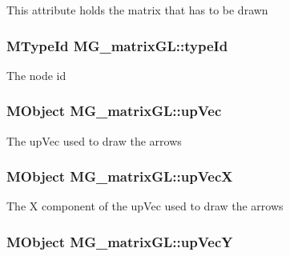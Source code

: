 This attribute holds the matrix that has to be drawn \hypertarget{class_m_g__matrix_g_l_a75dbb68a56bba1adac39fb0ba441b9db}{
\subsubsection[{type\-Id}]{\setlength{\rightskip}{0pt plus 5cm}M\-Type\-Id M\-G\-\_\-matrix\-G\-L\-::type\-Id\hspace{0.3cm}{\ttfamily [static]}}}\label{class_m_g__matrix_g_l_a75dbb68a56bba1adac39fb0ba441b9db}
The node id \hypertarget{class_m_g__matrix_g_l_a484c3621def1530581ceaf161accedc4}{
\subsubsection[{up\-Vec}]{\setlength{\rightskip}{0pt plus 5cm}M\-Object M\-G\-\_\-matrix\-G\-L\-::up\-Vec\hspace{0.3cm}{\ttfamily [static]}}}\label{class_m_g__matrix_g_l_a484c3621def1530581ceaf161accedc4}
The up\-Vec used to draw the arrows \hypertarget{class_m_g__matrix_g_l_a87088f365313b8f54aff381bb775a362}{
\subsubsection[{up\-Vec\-X}]{\setlength{\rightskip}{0pt plus 5cm}M\-Object M\-G\-\_\-matrix\-G\-L\-::up\-Vec\-X\hspace{0.3cm}{\ttfamily [static]}}}\label{class_m_g__matrix_g_l_a87088f365313b8f54aff381bb775a362}
The X component of the up\-Vec used to draw the arrows \hypertarget{class_m_g__matrix_g_l_a744964298d0a1ea37d1f1ea6942d9f41}{
\subsubsection[{up\-Vec\-Y}]{\setlength{\rightskip}{0pt plus 5cm}M\-Object M\-G\-\_\-matrix\-G\-L\-::up\-Vec\-Y\hspace{0.3cm}{\ttfamily [static]}}}\label{class_m_g__matrix_g_l_a744964298d0a1ea37d1f1ea6942d9f41}
